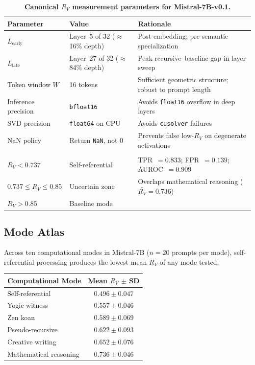 \documentclass{article}
\newcommand{\RV}{R_V}
\begin{document}
\begin{table}[ht]
\centering
\caption{\textbf{Canonical $\RV$ measurement parameters for Mistral-7B-v0.1.}}
\label{tab:params}
\smallskip
\small
\begin{tabular}{>{\raggedright}p{2.8cm}p{3.0cm}p{5.0cm}}
\toprule
\textbf{Parameter} & \textbf{Value} & \textbf{Rationale} \\
\midrule
$L_\mathrm{early}$ & Layer~5 of 32 ($\approx$16\% depth) & Post-embedding; pre-semantic specialization \\
$L_\mathrm{late}$  & Layer~27 of 32 ($\approx$84\% depth) & Peak recursive--baseline gap in layer sweep \\
Token window $W$   & 16 tokens & Sufficient geometric structure; robust to prompt length \\
Inference precision & \texttt{bfloat16} & Avoids \texttt{float16} overflow in deep layers \\
SVD precision      & \texttt{float64} on CPU & Avoids \texttt{cusolver} failures \\
NaN policy         & Return \texttt{NaN}, not 0 & Prevents false low-$\RV$ on degenerate activations \\
\midrule
\multicolumn{3}{l}{\textit{Detection threshold (Mistral-7B only)}} \\
$\RV < 0.737$              & Self-referential & TPR~$= 0.833$; FPR~$= 0.139$; AUROC~$= 0.909$ \\
$0.737 \leq \RV \leq 0.85$ & Uncertain zone   & Overlaps mathematical reasoning ($\bar{\RV} = 0.736$) \\
$\RV > 0.85$               & Baseline mode    & \\
\bottomrule
\end{tabular}
\end{table}

\subsection{Mode Atlas}
\label{sec:modes}

Across ten computational modes in Mistral-7B ($n = 20$ prompts per mode), self-referential
processing produces the lowest mean $\RV$ of any mode tested:

\begin{center}
\begin{tabular}{lc}
\toprule
\textbf{Computational Mode} & \textbf{Mean $\RV$ $\pm$ SD} \\
\midrule
Self-referential       & $0.496 \pm 0.047$ \\
Yogic witness          & $0.557 \pm 0.046$ \\
Zen koan               & $0.589 \pm 0.069$ \\
Pseudo-recursive       & $0.622 \pm 0.093$ \\
Creative writing       & $0.652 \pm 0.076$ \\
Mathematical reasoning & $0.736 \pm 0.046$ \\
\bottomrule
\end{tabular}
\end{center}
\end{document}
